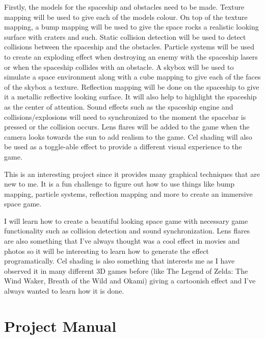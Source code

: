 \documentclass {article}
\begin{document}
	Firstly, the models for the spaceship and obstacles need to be made. Texture mapping will be used to give each of the models colour. On top of the texture mapping, a bump mapping will be used to give the space rocks a realistic looking surface with craters and such.
	Static collision detection will be used to detect collisions between the spaceship and the obstacles.
	Particle systems will be used to create an exploding effect when destroying an enemy with the spaceship lasers or when the spaceship collides with an obstacle. 
	A skybox will be used to simulate a space environment along with a cube mapping to give each of the faces of the skybox a texture. 
	Reflection mapping will be done on the spaceship to give it a metallic reflective looking surface. It will also help to highlight the spaceship as the center of attention.
	Sound effects such as the spaceship engine and collisions/explosions will need to synchronized to the moment the spacebar is pressed or the collision occurs.
	Lens flares will be added to the game when the camera looks towards the sun to add realism to the game.
	Cel shading will also be used as a toggle-able effect to provide a different visual experience to the game.
	
	
	
	This is an interesting project since it provides many graphical techniques that are new to me. It is a fun challenge to figure out how to use things like bump mapping, particle systems, reflection mapping and more to create an immersive space game.
	

	
	I will learn how to create a beautiful looking space game with necessary game functionality such as collision detection and sound synchronization. Lens flares are also something that I've always thought was a cool effect in movies and photos so it will be interesting to learn how to generate the effect programatically. 
	Cel shading is also something that interests me as I have observed it in many different 3D games before (like The Legend of Zelda: The Wind Waker, Breath of the Wild and Okami) giving a cartoonish effect and I've always wanted to learn how it is done.


\newpage
\section{Project Manual}
\end{document}
